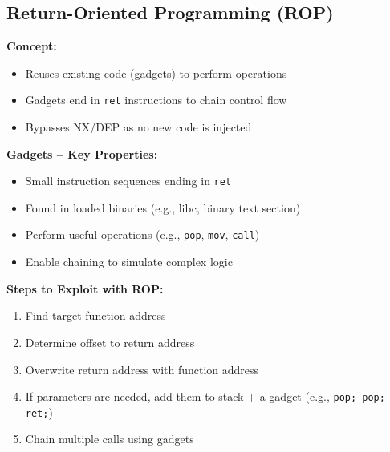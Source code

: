 \subsection{Return-Oriented Programming (ROP)}
{
\textbf{Concept:}
\begin{itemize}[noitemsep]
  \item Reuses existing code (gadgets) to perform operations
  \item Gadgets end in \texttt{ret} instructions to chain control flow
  \item Bypasses NX/DEP as no new code is injected
\end{itemize}

\textbf{Gadgets – Key Properties:}
\begin{itemize}[noitemsep]
  \item Small instruction sequences ending in \texttt{ret}
  \item Found in loaded binaries (e.g., libc, binary text section)
  \item Perform useful operations (e.g., \texttt{pop}, \texttt{mov}, \texttt{call})
  \item Enable chaining to simulate complex logic
\end{itemize}

\textbf{Steps to Exploit with ROP:}
\begin{enumerate}[noitemsep]
  \item Find target function address
  \item Determine offset to return address
  \item Overwrite return address with function address
  \item If parameters are needed, add them to stack + a gadget (e.g., \texttt{pop; pop; ret;})
  \item Chain multiple calls using gadgets
\end{enumerate}
}

